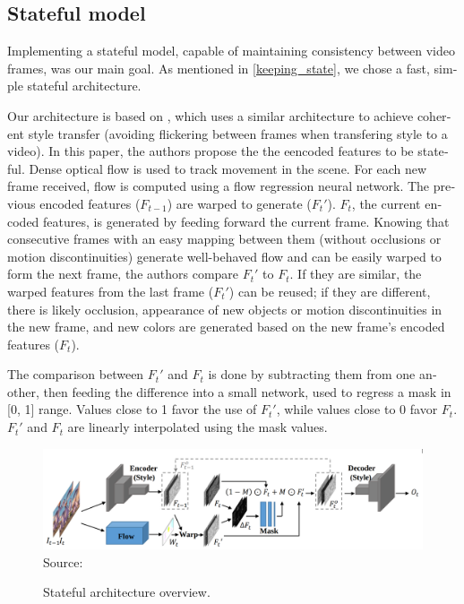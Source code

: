 \documentclass[12pt,openright,oneside,a4paper,english, brazilian]{abntex2}
\begin{document}
\begin{otherlanguage}{english}
\subsection{Stateful model}

Implementing a stateful model, capable of maintaining consistency between video frames, was our main goal. As mentioned in \ref{keeping_state}, we chose a fast, simple stateful architecture.

Our architecture is based on \cite{MSFT_transfer}, which uses a similar architecture to achieve coherent style transfer (avoiding flickering between frames when transfering style to a video). In this paper, the authors propose the the eencoded features to be stateful. Dense optical flow is used to track movement in the scene. For each new frame received, flow is computed using a flow regression neural network. The previous encoded features ($F_{t-1}$) are warped to generate ($F_t'$). $F_t$, the current encoded features, is generated by feeding forward the current frame. Knowing that consecutive frames with an easy mapping between them (without occlusions or motion discontinuities) generate well-behaved flow and can be easily warped to form the next frame, the authors compare $F_t'$ to $F_t$. If they are similar, the warped features from the last frame ($F_t'$) can be reused; if they are different, there is likely occlusion, appearance of new objects or motion discontinuities in the new frame, and new colors are generated based on the new frame's encoded features ($F_t$).

The comparison between $F_t'$ and $F_t$ is done by subtracting them from one another, then feeding the difference into a small network, used to regress a mask in [0, 1] range. Values close to 1 favor the use of $F_t'$, while values close to 0 favor $F_t$. $F_t'$ and $F_t$ are linearly interpolated using the mask values.

\begin{figure}[!htb]
\centering
\caption{Stateful architecture overview.}
\includegraphics[width=\textwidth]{optical_flow_arch}
Source: \cite{MSFT_transfer}
\label{optical_flow_arch}
\end{figure}


\end{otherlanguage}
\end{document}
